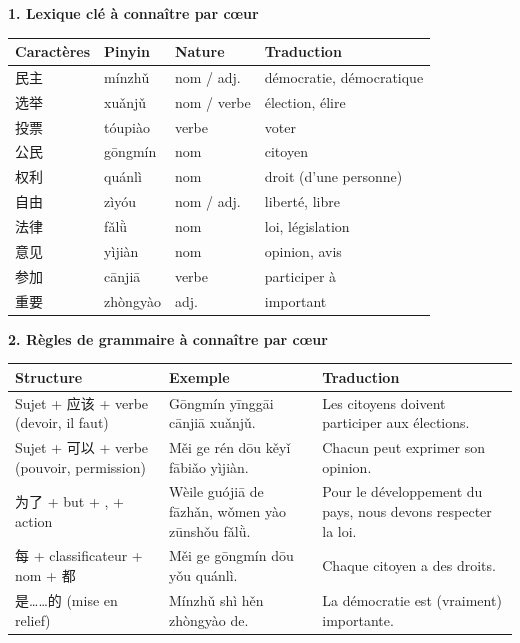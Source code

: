 \documentclass[11pt]{article}
\newcommand{\zh}[1]{\ifmmode\text{#1}\else{#1}\fi}
\begin{document}
\begin{bilan}
\textbf{1. Lexique clé à connaître par cœur}
\begin{center}
\begin{tabularx}{\linewidth}{|X|X|X|X|}
\hline
\rowcolor{popblueL} Caractères & Pinyin & Nature & Traduction \\
\hline
民主 & mínzhǔ & nom / adj. & démocratie, démocratique \\
\hline
选举 & xuǎnjǔ & nom / verbe & élection, élire \\
\hline
投票 & tóupiào & verbe & voter \\
\hline
公民 & gōngmín & nom & citoyen \\
\hline
权利 & quánlì & nom & droit (d'une personne) \\
\hline
自由 & zìyóu & nom / adj. & liberté, libre \\
\hline
法律 & fǎlǜ & nom & loi, législation \\
\hline
意见 & yìjiàn & nom & opinion, avis \\
\hline
参加 & cānjiā & verbe & participer à \\
\hline
重要 & zhòngyào & adj. & important \\
\hline
\end{tabularx}
\end{center}

\textbf{2. Règles de grammaire à connaître par cœur}
\begin{center}
\begin{tabularx}{\linewidth}{|X|X|X|}
\hline
\rowcolor{popblueL} Structure & Exemple & Traduction \\
\hline
Sujet + 应该 + verbe (devoir, il faut) & \zh{公民应该参加选举。} Gōngmín yīnggāi cānjiā xuǎnjǔ. & Les citoyens doivent participer aux élections. \\
\hline
Sujet + 可以 + verbe (pouvoir, permission) & \zh{每个人都可以发表意见。} Měi ge rén dōu kěyǐ fābiǎo yìjiàn. & Chacun peut exprimer son opinion. \\
\hline
为了 + but + , + action & \zh{为了国家的发展，我们要遵守法律。} Wèile guójiā de fāzhǎn, wǒmen yào zūnshǒu fǎlǜ. & Pour le développement du pays, nous devons respecter la loi. \\
\hline
每 + classificateur + nom + 都 & \zh{每个公民都有权利。} Měi ge gōngmín dōu yǒu quánlì. & Chaque citoyen a des droits. \\
\hline
是……的 (mise en relief) & \zh{民主是很重要的。} Mínzhǔ shì hěn zhòngyào de. & La démocratie est (vraiment) importante. \\
\hline
\end{tabularx}
\end{center}


\end{bilan}
\end{document}
